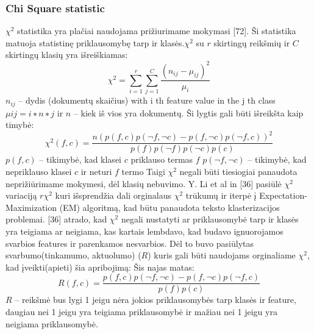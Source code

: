 \documentclass{VUMIFInfKursinis}
\begin{document}
\subsubsection{Chi Square statistic}
 $\chi^2$ statistika yra plačiai naudojama prižiurimame mokymasi [72]. Ši statistika matuoja statistinę priklausomybę tarp  ir klasės.$\chi^2$ su $r$ skirtingų reikšmių ir $C$ skirtingų klasių yra išreiškiamas:
\begin{equation}
	\chi^2=\sum _{i=1}^{r}{\sum _{j=1}^{C}{\frac {{(n_{ij}-\mu_{ij})}^{2}}{\mu_{i}}}}
\end{equation} 
$n_{ij}$ –  dydis (dokumentų skaičius) with i th feature value in the j th class
$μ ij = i∗ n ∗j$ ir $n$ – kiek iš vios yra dokumentų.
Ši lygtis gali būti išreikšta kaip timybė:
\begin{equation}
	\chi^2(f,c)=\frac{n(p(f,c)p(\neg f, \neg c) - p(f,\neg c)p(\neg f, c))^2}{p(f)p(\neg f)p(\neg c)p(c)}
\end{equation} 
$p(f,c)$ – tikimybė, kad klasei $c$ priklauso termas $f$
$p(\neg f,\neg c)$ – tikimybė, kad nepriklauso klasei $c$ ir neturi $f$ termo 
Taigi $\chi^2$ negali būti tiesiogiai panaudota neprižiūrimame mokymesi, dėl klasių nebuvimo. 
Y. Li et al in [36] pasiūlė $\chi^2$ variaciją $r\chi^2$ kuri išsprendžia dali orginalaus $\chi^2$ trūkumų ir iterpė į Expectation-Maximization (EM) algoritmą, kad būtu panaudota teksto klasterizacijos problemai. [36] atrado, kad $\chi^2$ negali nustatyti ar priklausomybė tarp  ir klasės yra teigiama ar neigiama, kas kartais lembdavo, kad budavo ignuorojamos svarbios features ir parenkamos nesvarbios. Dėl to buvo pasiūlytas svarbumo(tinkamumo, aktuolumo) ($R$) kuris gali būti naudojams orginaliame $\chi^2$, kad įveikti(apieti) šia apribojimą: Šis najas matas: 
\begin{equation}
	R(f,c)=\frac{p(f,c)p(\neg f, \neg c) - p(f,\neg c)p(\neg f, c)}{p(f)p(c)}
\end{equation} 
$R$ – reikšmė bus lygi 1 jeigu nėra jokios priklausomybės tarp klasės ir feature, daugiau nei 1 jeigu yra teigiama priklausomybė ir mažiau nei 1 jeigu yra neigiama priklausomybė.
\end{document}
